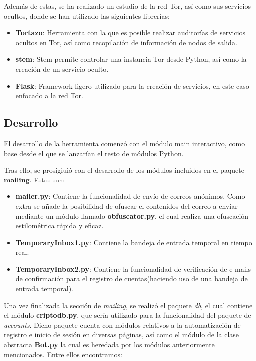 Además de estas, se ha realizado un estudio de la red Tor, así como sus servicios ocultos, donde se han utilizado las siguientes librerías:
\begin{itemize}
	\item \textbf{Tortazo}: Herramienta con la que es posible realizar auditorías de servicios ocultos en Tor, así como recopilación de información de nodos de salida.
	\item \textbf{stem}: Stem permite controlar una instancia Tor desde Python, así como la creación de un servicio oculto.
	\item \textbf{Flask}: Framework ligero utilizado para la creación de servicios, en este caso enfocado a la red Tor.
\end{itemize}
\subsection{Desarrollo}

El desarrollo de la herramienta comenzó con el módulo main interactivo, como base desde el que se lanzarían el resto de módulos Python.

Tras ello, se prosigiuió con el desarrollo de los módulos incluidos en el paquete \textbf{mailing}. Estos son:
\begin{itemize}
	\item \textbf{mailer.py}: Contiene la funcionalidad de envío de correos anónimos. Como extra se añade la posibilidad de ofuscar el contenidos del correo a enviar mediante un módulo llamado \textbf{obfuscator.py}, el cual realiza una ofuscación estilométrica rápida y eficaz.
	\item \textbf{TemporaryInbox1.py}: Contiene la bandeja de entrada temporal en tiempo real.
	\item \textbf{TemporaryInbox2.py}: Contiene la funcionalidad de verificación de e-mails de confirmación para el registro de cuentas(haciendo uso de una bandeja de entrada temporal).
\end{itemize}

Una vez finalizada la sección de \textit{mailing}, se realizó el paquete \textit{db}, el cual contiene el módulo \textbf{criptodb.py}, que sería utilizado para la funcionalidad del paquete de \textit{accounts}.
Dicho paquete cuenta con módulos relativos a la automatización de registro e inicio de sesión en diversas páginas, así como el módulo de la clase abstracta \textbf{Bot.py} la cual es heredada por los módulos anteriormente mencionados. Entre ellos encontramos:

